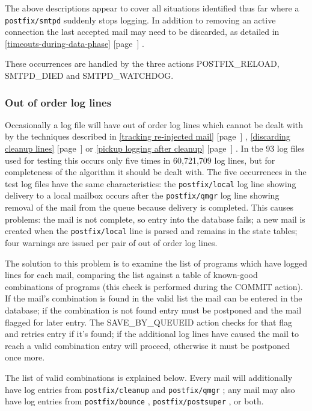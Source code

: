 \documentclass[a4paper,12pt,draft]{article}
\newcommand{\refwithpage}[1]{%
    \empty{}\ref{#1} [page~\pageref{#1}]%
}
\newcommand{\sectionref}[1]{%
    \textsection{}\refwithpage{#1}%
}
\newcommand{\daemon}[1]{%
    \texttt{postfix/#1}%
}
\newcommand{\numberOFlogFILES}[0]{%
    93%
}
\begin{document}
The above descriptions appear to cover all situations identified thus far
where a \daemon{smtpd} suddenly stops logging.  In addition to removing an
active connection the last accepted mail may need to be discarded, as
detailed in \sectionref{timeouts-during-data-phase}.

These occurrences are handled by the three actions POSTFIX\_RELOAD,
SMTPD\_DIED and SMTPD\_WATCHDOG\@.

\subsubsection{Out of order log lines}

\label{out of order log lines}

Occasionally a log file will have out of order log lines which cannot be
dealt with by the techniques described in \sectionref{tracking re-injected
mail}, \sectionref{discarding cleanup lines} or \sectionref{pickup logging
after cleanup}.  In the \numberOFlogFILES{} log files used for testing this
occurs only five times in 60,721,709 log lines, but for completeness of the
algorithm it should be dealt with.  The five occurrences in the test log
files have the same characteristics: the \daemon{local} log line showing
delivery to a local mailbox occurs after the \daemon{qmgr} log line showing
removal of the mail from the queue because delivery is completed.  This
causes problems: the mail is not complete, so entry into the database
fails; a new mail is created when the \daemon{local} line is parsed and
remains in the state tables; four warnings are issued per pair of out of
order log lines.

The solution to this problem is to examine the list of programs which have
logged lines for each mail, comparing the list against a table of
known-good combinations of programs (this check is performed during the
COMMIT action).  If the mail's combination is found in the valid list the
mail can be entered in the database; if the combination is not found entry
must be postponed and the mail flagged for later entry.  The
SAVE\_BY\_QUEUEID action checks for that flag and retries entry if it's
found; if the additional log lines have caused the mail to reach a valid
combination entry will proceed, otherwise it must be postponed once more.

The list of valid combinations is explained below.  Every mail will
additionally have log entries from \daemon{cleanup} and \daemon{qmgr}; any
mail may also have log entries from \daemon{bounce}, \daemon{postsuper}, or
both.
\end{document}
